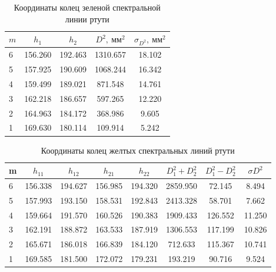 \documentclass[12pt]{article}
\begin{document}
    \begin{table}[b]
        \centering
        \label{tab:tab1}
        \caption{Координаты колец зеленой спектральной линии ртути}
        \begin{tabular}{|lcccc|}
            \hline
            $m$ & $h_1$   & $h_2$   & $D^2,\ \text{мм}^2$ & $\sigma_{D^2},\ \text{мм}^2$ \\\hline
            6   & 156.260 & 192.463 & 1310.657            & 18.102                       \\
            5   & 157.925 & 190.609 & 1068.244            & 16.342                       \\
            4   & 159.499 & 189.021 & 871.548             & 14.761                       \\
            3   & 162.218 & 186.657 & 597.265             & 12.220                       \\
            2   & 164.963 & 184.172 & 368.986             & 9.605                        \\
            1   & 169.630 & 180.114 & 109.914             & 5.242                        \\
            \hline
        \end{tabular}
    \end{table}

    \begin{table}[b]
        \centering
        \label{tab:tab2}
        \caption{Координаты колец желтых спектральных линий ртути}
        \begin{tabular}{|lccccccc|}
            \hline
            m & $h_{11}$ & $h_{12}$ & $h_{21}$ & $h_{22}$ & $D_1^2 + D_2^2$ & $D_1^2 - D^2_2$ & $\sigma D^2$ \\\hline
            6 & 156.338  & 194.627  & 156.985  & 194.320  & 2859.950        & 72.145          & 8.494        \\
            5 & 157.993  & 193.150  & 158.531  & 192.843  & 2413.328        & 58.701          & 7.662        \\
            4 & 159.664  & 191.570  & 160.526  & 190.383  & 1909.433        & 126.552         & 11.250       \\
            3 & 162.191  & 188.872  & 163.533  & 187.919  & 1306.553        & 117.199         & 10.826       \\
            2 & 165.671  & 186.018  & 166.839  & 184.120  & 712.633         & 115.367         & 10.741       \\
            1 & 169.585  & 181.500  & 172.072  & 179.231  & 193.219         & 90.716          & 9.524        \\\hline
        \end{tabular}
    \end{table}
\end{document}
